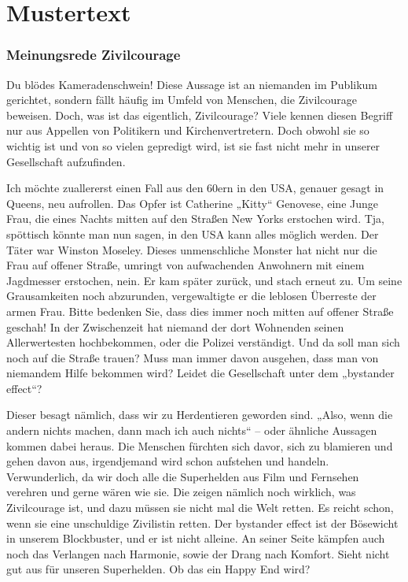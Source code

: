
\section{Mustertext}
\subsubsection{Meinungsrede Zivilcourage}
Du blödes Kameradenschwein! Diese Aussage ist an niemanden im Publikum gerichtet, sondern fällt häufig im Umfeld von Menschen, die Zivilcourage beweisen. Doch, was ist das eigentlich, Zivilcourage? Viele kennen diesen Begriff nur aus Appellen von Politikern und Kirchenvertretern. Doch obwohl sie so wichtig ist und von so vielen gepredigt wird, ist sie fast nicht mehr in unserer Gesellschaft aufzufinden.  

Ich möchte zuallererst einen Fall aus den 60ern in den USA, genauer gesagt in Queens, neu aufrollen. Das Opfer ist Catherine „Kitty“ Genovese, eine Junge Frau, die eines Nachts mitten auf den Straßen New Yorks erstochen wird. Tja, spöttisch könnte man nun sagen, in den USA kann alles möglich werden. Der Täter war Winston Moseley. Dieses unmenschliche Monster hat nicht nur die Frau auf offener Straße, umringt von aufwachenden Anwohnern mit einem Jagdmesser erstochen, nein. Er kam später zurück, und stach erneut zu. Um seine Grausamkeiten noch abzurunden, vergewaltigte er die leblosen Überreste der armen Frau. Bitte bedenken Sie, dass dies immer noch mitten auf offener Straße geschah! In der Zwischenzeit hat niemand der dort Wohnenden seinen Allerwertesten hochbekommen, oder die Polizei verständigt. Und da soll man sich noch auf die Straße trauen? Muss man immer davon ausgehen, dass man von niemandem Hilfe bekommen wird? Leidet die Gesellschaft unter dem „bystander effect“? 

Dieser besagt nämlich, dass wir zu Herdentieren geworden sind. „Also, wenn die andern nichts machen, dann mach ich auch nichts“ – oder ähnliche Aussagen kommen dabei heraus. Die Menschen fürchten sich davor, sich zu blamieren und gehen davon aus, irgendjemand wird schon aufstehen und handeln. Verwunderlich, da wir doch alle die Superhelden aus Film und Fernsehen verehren und gerne wären wie sie. Die zeigen nämlich noch wirklich, was Zivilcourage ist, und dazu müssen sie nicht mal die Welt retten. Es reicht schon, wenn sie eine unschuldige Zivilistin retten. Der bystander effect ist der Bösewicht in unserem Blockbuster, und er ist nicht alleine. An seiner Seite kämpfen auch noch das Verlangen nach Harmonie, sowie der Drang nach Komfort. Sieht nicht gut aus für unseren Superhelden. Ob das ein Happy End wird? 

